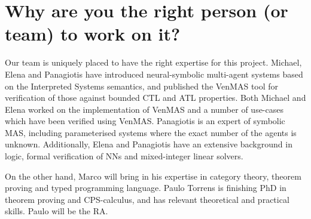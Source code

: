 \documentclass[11pt]{article}
\begin{document}
\section{Why are you the right person (or
team) to work on it?}


Our team is uniquely placed to have the right expertise for this
project. Michael, Elena and Panagiotis have introduced neural-symbolic
multi-agent systems based on the Interpreted Systems semantics, and
published the VenMAS tool for verification of those against bounded
CTL and ATL properties.  Both Michael and Elena worked on the
implementation of VenMAS and a number of use-cases which have been
verified using VenMAS.  Panagiotis is an expert of symbolic MAS,
including parameterised systems where the exact number of the agents
is unknown.  Additionally, Elena and Panagiotis have an extensive
background in logic, formal verification of NNs and mixed-integer
linear solvers.

On the other hand, Marco will bring in his expertise in category
theory, theorem proving and typed programming language.  Paulo Torrens
is finishing PhD in theorem proving and CPS-calculus, and has relevant
theoretical and practical skills. Paulo will be the RA.

 



\end{document}
